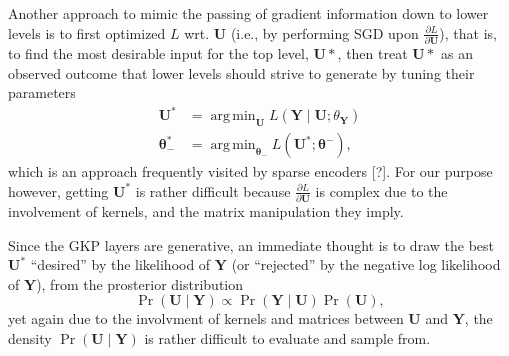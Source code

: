 \documentclass[11pt]{article}
\newcommand{\bs}{\boldsymbol}
\newcommand{\xu}{\boldsymbol{U}}
\newcommand{\xy}{\boldsymbol{Y}}
\newcommand{\PDV}[2]{\frac{\partial #1}{\partial #2}}
\DeclareMathOperator*{\argmin}{arg\,min}
\begin{document}
Another approach to mimic the passing of gradient information down to lower levels is to first optimized $L$ wrt. $\xu$ (i.e., by performing SGD upon $\PDV{L}{\xu}$), that is, to find the most desirable input for the top level, $\xu*$, then treat $\xu*$ as an observed outcome that lower levels should strive to generate by tuning their parameters
\begin{equation}
\begin{split}
  \xu^*    &= \argmin_{\xu} L(\xy \mid \xu; \theta_{\xy}) \\
  \bs{\theta}^*_- &= \argmin_{\bs{\theta_-}} L(\xu^*; \bs{\theta}^-),
\end{split}
\end{equation}
which is an approach frequently visited by sparse encoders [?]. For our purpose however, getting $\xu^*$ is rather difficult because $\PDV{L}{\xu}$ is complex due to the involvement of kernels, and the matrix manipulation they imply.

Since the GKP layers are generative, an immediate thought is to draw the best $\xu^*$ ``desired'' by the likelihood of $\xy$ (or ``rejected'' by the negative log likelihood of $\xy$), from the prosterior distribution
\begin{equation}
  \Pr(\xu \mid \xy) \propto \Pr(\xy \mid \xu)\Pr(\xu),
\end{equation}
yet again due to the involvment of kernels and matrices between $\xu$ and $\xy$, the density $\Pr(\xu \mid \xy)$ is rather difficult to evaluate and sample from.
\end{document}
